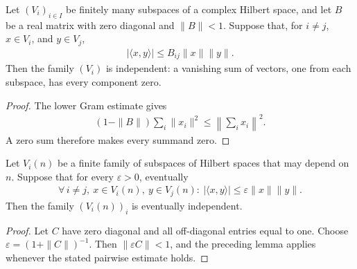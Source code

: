 \begin{lemma}
    \label{thm:subspace_independence_overlap_matrix}
    \leanok
    Let $(V_i)_{i\in I}$ be finitely many subspaces of a complex Hilbert
    space, and let $B$ be a real matrix with zero diagonal and $\|B\|<1$.
    Suppose that, for $i\ne j$, $x\in V_i$, and $y\in V_j$,
    \begin{align}
        |\langle x,y\rangle|\le B_{ij}\|x\|\|y\|.
    \end{align}
    Then the family $(V_i)$ is independent: a vanishing sum of vectors,
    one from each subspace, has every component zero.
\end{lemma}
\begin{proof}\leanok
    The lower Gram estimate gives
    \begin{align}
        (1-\|B\|)\sum_i\|x_i\|^2
        \le\left\|\sum_i x_i\right\|^2.
    \end{align}
    A zero sum therefore makes every summand zero.
\end{proof}

\begin{lemma}
    \label{thm:asymptotic_subspace_independence}
    \leanok
    Let $V_i(n)$ be a finite family of subspaces of Hilbert spaces that
    may depend on $n$. Suppose that for every $\varepsilon>0$, eventually
    \begin{align}
        \forall\,i\ne j,\ x\in V_i(n),\ y\in V_j(n):\ |\langle x,y\rangle|\le\varepsilon\|x\|\|y\|.
    \end{align}
    Then the family $(V_i(n))_i$ is eventually independent.
\end{lemma}
\begin{proof}\leanok
    Let $C$ have zero diagonal and all off-diagonal entries equal to one.
    Choose $\varepsilon=(1+\|C\|)^{-1}$. Then
    $\|\varepsilon C\|<1$, and the preceding lemma applies whenever
    the stated pairwise estimate holds.
\end{proof}

